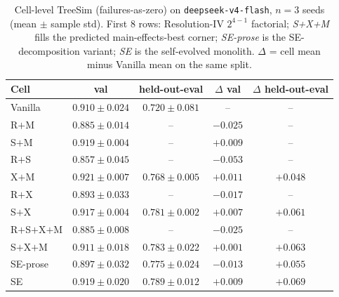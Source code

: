 \documentclass{article}
\begin{document}
\begin{table}[t]
  \caption{Cell-level TreeSim (failures-as-zero) on \texttt{deepseek-v4-flash}, $n=3$ seeds (mean $\pm$ sample std). First 8 rows: Resolution-IV $2^{4-1}$ factorial; \emph{S+X+M} fills the predicted main-effects-best corner; \emph{SE-prose} is the SE-decomposition variant; \emph{SE} is the self-evolved monolith. $\Delta$ = cell mean minus Vanilla mean on the same split.}
  \label{tab:main-results}
  \centering
  \small
  \begin{tabular}{lcccc}
    \toprule
    \textbf{Cell} & \textbf{val} & \textbf{held-out-eval} & \textbf{$\Delta$ val} & \textbf{$\Delta$ held-out-eval} \\
    \midrule
    Vanilla        & $0.910 \pm 0.024$           & $0.720 \pm 0.081$            & --                & --                \\
    R$+$M          & $0.885 \pm 0.014$           & --                           & $-0.025$          & --                \\
    S$+$M          & $0.919 \pm 0.004$           & --                           & $+0.009$          & --                \\
    R$+$S          & $0.857 \pm 0.045$           & --                           & $-0.053$          & --                \\
    X$+$M          & $\mathbf{0.921 \pm 0.007}$  & $0.768 \pm 0.005$            & $\mathbf{+0.011}$ & $+0.048$          \\
    R$+$X          & $0.893 \pm 0.033$           & --                           & $-0.017$          & --                \\
    S$+$X          & $0.917 \pm 0.004$           & $0.781 \pm \mathbf{0.002}$   & $+0.007$          & $+0.061$          \\
    R$+$S$+$X$+$M  & $0.885 \pm 0.008$           & --                           & $-0.025$          & --                \\
    S$+$X$+$M      & $0.911 \pm 0.018$           & $0.783 \pm 0.022$            & $+0.001$          & $+0.063$          \\
    SE-prose       & $0.897 \pm 0.032$           & $0.775 \pm 0.024$            & $-0.013$          & $+0.055$          \\
    SE             & $0.919 \pm 0.020$           & $\mathbf{0.789 \pm 0.012}$   & $+0.009$          & $\mathbf{+0.069}$ \\
    \bottomrule
  \end{tabular}
\end{table}
\end{document}
